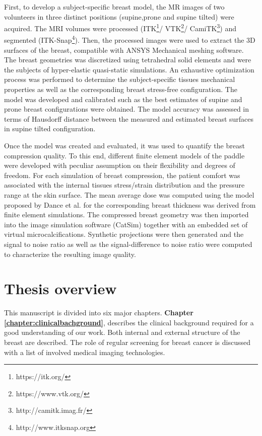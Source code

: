 First, to develop a subject-specific breast model, the MR images of two volunteers in three distinct positions (supine,prone and supine tilted) were acquired. The MRI volumes were processed (ITK\footnote{https://itk.org/}/ VTK\footnote{https://www.vtk.org/}/ CamiTK\footnote{http://camitk.imag.fr/}) and segmented (ITK-Snap\footnote{http://www.itksnap.org}). Then, the processed images were used to extract the 3D surfaces of the breast, compatible with ANSYS Mechanical meshing software. The breast geometries was discretized using tetrahedral solid elements and were the subjects of hyper-elastic quasi-static simulations. An exhaustive optimization process was performed to determine the subject-specific tissues mechanical properties as well as the corresponding breast stress-free configuration. The model was developed and calibrated such as the best estimates of supine and prone breast configurations were obtained. The model accuracy was assessed in terms of Hausdorff distance between the measured and estimated breast surfaces in supine tilted configuration.

Once the model was created and evaluated, it was used to quantify the breast compression quality. To this end, different finite element models of the paddle were developed with peculiar assumption on their flexibility and degrees of freedom. For each simulation of breast compression, the patient comfort was associated with the internal tissues stress/strain distribution and the pressure range at the skin surface. The mean average dose was computed using the model proposed by Dance et al. \cite{dance_additional_2000} for the corresponding breast thickness was derived from finite element simulations. The compressed breast geometry was then imported into the image simulation software (CatSim) together with an embedded set of virtual microcalcifications. Synthetic projections were then generated and the signal to noise ratio as well as the signal-difference to noise ratio were computed to characterize the resulting image quality.   

\cleardoublepage
\chapter*{Thesis overview}\label{section:thesisoverview}

This manuscript is divided into six major chapters.  \textbf{Chapter \ref{chapter:clinicalbachground}}, describes the clinical background  required for a good understanding of our work. Both internal and external structure of the breast are described. The role of regular screening for breast cancer is discussed with a list of involved medical imaging technologies. 

